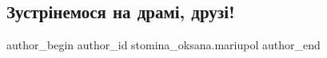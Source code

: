 
 
 
 
 

\subsection{Зустрінемося на драмі, друзі!}
\label{sec:16_03_2023.fb.stomina_oksana.mariupol.1.zustrinemos_na_drami_druzi}

\ifcmt
 author_begin
   author_id stomina_oksana.mariupol
 author_end
\fi
